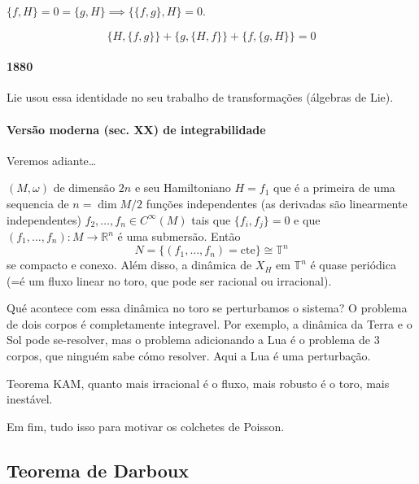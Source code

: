 \begin{thm}[Poisson]
	$\{f,H\} =0=\{g,H\} \implies \{\{f,g\},H\} =0$.
\end{thm}

\begin{thm}[Jacobi]\leavevmode
	\[\{H,\{f,g\}\} +\{g,\{H,f\}\} +\{f,\{g,H\}\} =0\]
\end{thm}

\paragraph{1880} Lie usou essa identidade no seu trabalho de transforma\c c\~oes (\'algebras de  Lie).

\paragraph{Vers\~ao moderna (sec.  XX) de integrabilidade} Veremos adiante…

\begin{thm}\leavevmode
	$(M,\omega)$ de dimens\~ao $2n$ e seu Hamiltoniano $H=f_1$ que \'e a primeira de uma sequencia de $n=\dim M/2$ fun\c c\~oes independentes (as derivadas s\~ao linearmente independentes) $f_2,\ldots,f_n\in C^{\infty}(M)$ tais que $\{f_i,f_j\} =0$ e que $(f_1,\ldots,f_n):M\to \mathbb{R}^{n}$ \'e uma submers\~ao. Ent\~ao
	\[N=\{(f_1,\ldots,f_n)=\text{cte} \} \cong \mathbb{T}^n\]
	se compacto e conexo. Al\'em disso, a din\^amica de $X_H$ em $\mathbb{T}^n$ \'e quase peri\'odica (=\'e um fluxo linear no toro, que pode ser racional ou irracional).
\end{thm}

\begin{remark}[Projeto?]\leavevmode
	Qu\'e acontece com essa din\^amica no toro se perturbamos o sistema? O problema de dois corpos \'e completamente integravel. Por exemplo, a din\^amica da Terra e o Sol pode se-resolver, mas o problema adicionando a Lua \'e o problema de 3 corpos, que ningu\'em sabe c\'omo resolver. Aqui a Lua \'e uma perturba\c c\~ao.

	Teorema KAM, quanto mais irracional \'e o fluxo, mais robusto \'e o toro, mais inest\'avel.
\end{remark}

Em fim, tudo isso para motivar os colchetes de Poisson.

\subsection{Teorema de Darboux}

